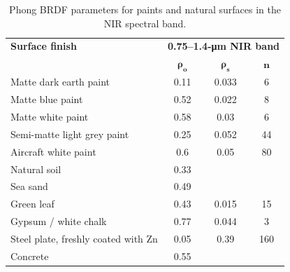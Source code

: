 \begin{table}[t]
\centering
\caption{Phong BRDF parameters for paints and natural surfaces in the NIR spectral band.\label{brdftab}}
{\small
\begin{tabular}{|l|c|c|c|}
\hline
\textbf{Surface finish} &\multicolumn{3}{c|}{\textbf{0.75--1.4-\si{\micro\metre}{} NIR band}} \\
\cline{2-4}
 & $\bm{ \rho_o}$& $\bm{\rho_s}$ & $\bm{n}$ \\
\hline
Matte dark earth paint & 0.11 & 0.033 & 6\\
Matte blue paint & 0.52 & 0.022 & 8\\
Matte white paint & 0.58 & 0.03 & 6\\
Semi-matte light grey paint & 0.25 & 0.052 & 44\\
Aircraft white paint & 0.6 & 0.05 & 80 \\
\hline
Natural soil & 0.33 & & \\
Sea sand & 0.49 && \\
Green leaf & 0.43 & 0.015 & 15\\
Gypsum / white chalk & 0.77 & 0.044 & 3\\
Steel plate, freshly coated with Zn& 0.05 & 0.39 & 160\\
Concrete & 0.55 & & \\
\hline
\end{tabular}
}
\end{table}


\afterpage{\clearpage}


